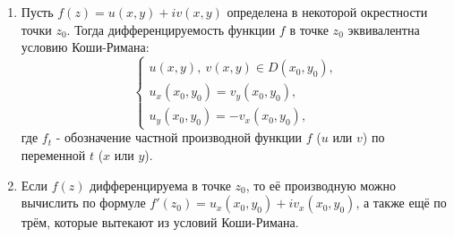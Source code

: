 \begin{statement} \label{9:Koshi_Riman} \leavevmode
    \begin{enumerate}[wide=20pt, label=\arabic*., itemsep=1ex]
    \item Пусть \(f(z) = u(x, y) + iv(x, y)\) определена в некоторой окрестности точки \(z_0\).
    Тогда дифференцируемость функции \(f\) в точке \(z_0\) эквивалентна условию Коши-Римана:
    \begin{equation*}
    \begin{cases}
    u(x, y), \ v(x,y) \in D(x_0, y_0), \\
    u_x (x_0, y_0) = v_y (x_0, y_0), \\
    u_y (x_0, y_0) = - v_x (x_0, y_0),
    \end{cases}
    \end{equation*}
    где \(f_t\) - обозначение частной производной функции \(f\) (\(u\) или \(v\)) по переменной
    \(t\) (\(x\) или \(y\)).

    \item Если \(f(z)\) дифференцируема в точке \(z_0\), то её производную можно вычислить по
    формуле \(f'(z_0) = u_x(x_0, y_0) + iv_x(x_0, y_0)\), а также ещё по трём, которые вытекают из
    условий Коши-Римана.
\end{enumerate}
\end{statement}
